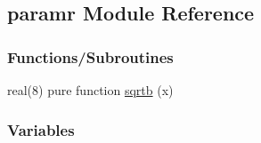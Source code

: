 \hypertarget{namespaceparamr}{}\subsection{paramr Module Reference}
\label{namespaceparamr}
\subsubsection*{Functions/\+Subroutines}
\begin{DoxyCompactItemize}
\item 
real(8) pure function \hyperlink{namespaceparamr_a53c781b6c851a009fdda9383f9289cf6}{sqrtb} (x)
\end{DoxyCompactItemize}
\subsubsection*{Variables}
